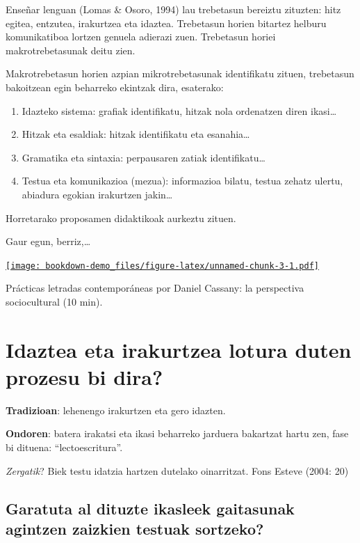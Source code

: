 \documentclass[
]{book}
\providecommand{\tightlist}{%
  \setlength{\itemsep}{0pt}\setlength{\parskip}{0pt}}
\begin{document}
Enseñar lenguan (Lomas \& Osoro, 1994) lau trebetasun bereiztu zituzten: hitz egitea, entzutea, irakurtzea eta idaztea. Trebetasun horien bitartez helburu komunikatiboa lortzen genuela adierazi zuen. Trebetasun horiei makrotrebetasunak deitu zien.

Makrotrebetasun horien azpian mikrotrebetasunak identifikatu zituen, trebetasun bakoitzean egin beharreko ekintzak dira, esaterako:

\begin{enumerate}
\def\labelenumi{\arabic{enumi}.}
\tightlist
\item
  Idazteko sistema: grafiak identifikatu, hitzak nola ordenatzen diren ikasi\ldots{}
\item
  Hitzak eta esaldiak: hitzak identifikatu eta esanahia\ldots{}
\item
  Gramatika eta sintaxia: perpausaren zatiak identifikatu\ldots{}
\item
  Testua eta komunikazioa (mezua): informazioa bilatu, testua zehatz ulertu, abiadura egokian irakurtzen jakin\ldots{}
\end{enumerate}

Horretarako proposamen didaktikoak aurkeztu zituen.

Gaur egun, berriz,\ldots{}

\href{https://www.youtube.com/embed/lsHc3SWiWEQ?rel=0}{\texttt{[image: bookdown-demo\_files/figure-latex/unnamed-chunk-3-1.pdf]}}

Prácticas letradas contemporáneas por Daniel Cassany: la perspectiva sociocultural (10 min).

\hypertarget{idaztea-eta-irakurtzea-lotura-duten-prozesu-bi-dira}{%
\section{Idaztea eta irakurtzea lotura duten prozesu bi dira?}\label{idaztea-eta-irakurtzea-lotura-duten-prozesu-bi-dira}}

\textbf{Tradizioan}: lehenengo irakurtzen eta gero idazten.

\textbf{Ondoren}: batera irakatsi eta ikasi beharreko jarduera bakartzat hartu zen, fase bi dituena: ``lectoescritura''.

\emph{Zergatik}? Biek testu idatzia hartzen dutelako oinarritzat.
Fons Esteve (2004: 20)

\hypertarget{garatuta-al-dituzte-ikasleek-gaitasunak-agintzen-zaizkien-testuak-sortzeko}{%
\subsection{Garatuta al dituzte ikasleek gaitasunak agintzen zaizkien testuak sortzeko?}\label{garatuta-al-dituzte-ikasleek-gaitasunak-agintzen-zaizkien-testuak-sortzeko}}
\end{document}
